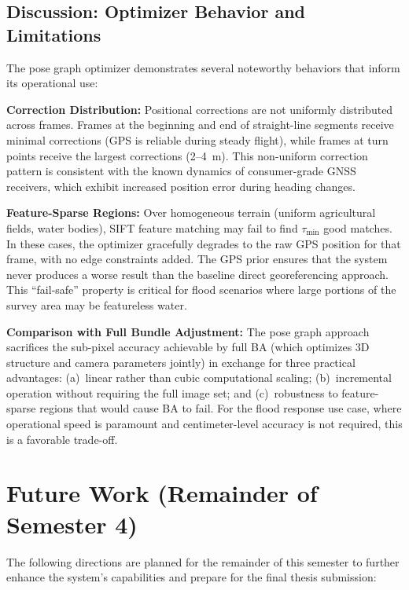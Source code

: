 \documentclass[conference]{IEEEtran}
\begin{document}
\subsection{Discussion: Optimizer Behavior and Limitations}

The pose graph optimizer demonstrates several noteworthy behaviors that inform its operational use:

\textbf{Correction Distribution:} Positional corrections are not uniformly distributed across frames. Frames at the beginning and end of straight-line segments receive minimal corrections (GPS is reliable during steady flight), while frames at turn points receive the largest corrections (2--4~m). This non-uniform correction pattern is consistent with the known dynamics of consumer-grade GNSS receivers, which exhibit increased position error during heading changes.

\textbf{Feature-Sparse Regions:} Over homogeneous terrain (uniform agricultural fields, water bodies), SIFT feature matching may fail to find $\tau_{\text{min}}$ good matches. In these cases, the optimizer gracefully degrades to the raw GPS position for that frame, with no edge constraints added. The GPS prior ensures that the system never produces a worse result than the baseline direct georeferencing approach. This ``fail-safe'' property is critical for flood scenarios where large portions of the survey area may be featureless water.

\textbf{Comparison with Full Bundle Adjustment:} The pose graph approach sacrifices the sub-pixel accuracy achievable by full BA (which optimizes 3D structure and camera parameters jointly) in exchange for three practical advantages: (a)~linear rather than cubic computational scaling; (b)~incremental operation without requiring the full image set; and (c)~robustness to feature-sparse regions that would cause BA to fail. For the flood response use case, where operational speed is paramount and centimeter-level accuracy is not required, this is a favorable trade-off.


\section{Future Work (Remainder of Semester 4)}
\label{sec:future}

The following directions are planned for the remainder of this semester to further enhance the system's capabilities and prepare for the final thesis submission:
\end{document}
